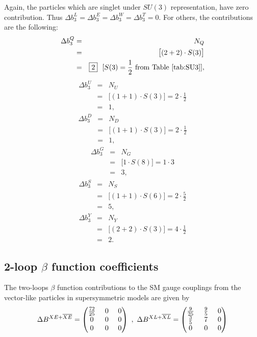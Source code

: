 \documentclass[11pt,prd,superscriptaddress,nofootinbib]{revtex4-1}
\numberwithin{equation}{section}
\newcommand{\bea}{\begin{eqnarray}}
\newcommand{\eea}{\end{eqnarray}}
\begin{document}
\noindent
Again, the particles which are singlet under $SU(3)$ representation, have zero contribution. Thus $\Delta b_3^L= \Delta b_3^E=\Delta b_3^W=\Delta b_3^T=0$. For others, the contributions are the following:
\bea
\label{XQb3}
\Delta b_3^Q &=& N_Q \nonumber\\ 
&=&  \big[(2+2)\cdot S(3)\big]\nonumber\\
&=&  \boxed{2} ~~[S(3)=\frac{1}{2} ~\rm from~Table~ \ref{tab:SU3}],
\eea
\bea
\label{XUb3}
\Delta b_3^U &=& N_U \nonumber\\ 
&=&  \big[(1+1)\cdot S(3)\big]=2\cdot\frac{1}{2}\nonumber\\
&=&  \boxed{1}, 
\eea
\bea
\label{XDb3}
\Delta b_3^D &=& N_D \nonumber\\ 
&=&  \big[(1+1)\cdot S(3)\big]=2\cdot\frac{1}{2}\nonumber\\
&=&  \boxed{1}, 
\eea
\bea
\label{XGb3}
\Delta b_3^G &=& N_G \nonumber\\ 
&=&  \big[1\cdot S(8)\big]=1\cdot 3\nonumber\\
&=&  \boxed{3}, 
\eea
\bea
\label{XSb3}
\Delta b_3^S &=& N_S \nonumber\\ 
&=&  \big[(1+1)\cdot S(6)\big]=2\cdot\frac{5}{2}\nonumber\\
&=&  \boxed{5}, 
\eea
\bea
\label{XYb3}
\Delta b_3^Y &=& N_Y \nonumber\\ 
&=&  \big[(2+2)\cdot S(3)\big]=4\cdot\frac{1}{2}\nonumber\\
&=&  \boxed{2}. 
\eea



\subsection{2-loop $\beta$ function coefficients}

The two-loops $\beta$ function contributions to the SM gauge couplings from the vector-like particles in supersymmetric models are given by \cite{Barger:2007qb}
\begin{eqnarray}
\label{VectorBcoeff}
\Delta B^{XE + {\overline{XE}}}=\begin{pmatrix}
\frac{72}{25}&~
0 & ~0 \cr 0 & ~0 & ~0 \cr
0 & ~0 & ~0 \end{pmatrix}  ~,~
\Delta B^{XL + {\overline{XL}}}=\begin{pmatrix}\frac{9}{25}&
~\frac{9}{5}& ~0 \cr \frac{3}{5} & ~7 & ~0 \cr
0 & ~0 & ~0
\end{pmatrix}
\end{eqnarray}
\end{document}
